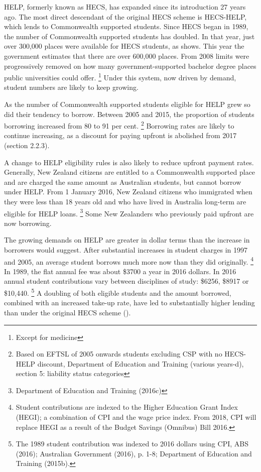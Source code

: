\documentclass[embargoed]{grattan}
\begin{document}
HELP, formerly known as HECS, has expanded since its introduction 27 years ago.
The most direct descendant of the original HECS scheme is HECS-HELP, which lends to Commonwealth supported students.
Since HECS began in 1989, the number of Commonwealth supported students has doubled.
In that year, just over 300,000 places were available for HECS students, as  shows.\afterpage{\cleardoublepage} %
This year the government estimates that there are over 600,000 places.
From 2008 limits were progressively removed on how many government-supported bachelor degree places public universities could offer.%
\footnote{Except for medicine} Under this system, now driven by demand, student numbers are likely to keep growing.


As the number of Commonwealth supported students eligible for HELP grew so did their tendency to borrow.
Between 2005 and 2015, the proportion of students borrowing increased from 80 to 91 per cent.%
\footnote{Based on EFTSL of 2005 onwards students excluding CSP with no HECS-HELP discount, Department of Education and Training (various years-d), section 5: liability status categories} Borrowing rates are likely to continue increasing, as a discount for paying upfront is abolished from 2017 (section 2.2.3).

A change to HELP eligibility rules is also likely to reduce upfront payment rates.
Generally, New Zealand citizens are entitled to a Commonwealth supported place and are charged the same amount as Australian students, but cannot borrow under HELP.
From 1 January 2016, New Zealand citizens who immigrated when they were less than 18 years old and who have lived in Australia long-term are eligible for HELP loans.%
\footnote{Department of Education and Training (2016c)} Some New Zealanders who previously paid upfront are now borrowing.

The growing demands on HELP are greater in dollar terms than the increase in borrowers would suggest.
After substantial increases in student charges in 1997 and 2005, an average student borrows much more now than they did originally.%
\footnote{Student contributions are indexed to the Higher Education Grant Index (HEGI); a combination of \gls{CPI} and the wage price index.
From 2018, \gls{CPI} will replace HEGI as a result of the Budget Savings (Omnibus) Bill 2016.} In 1989, the flat annual fee was about \$3700 a year in 2016 dollars.
In 2016 annual student contributions vary between disciplines of study: \$6256, \$8917 or \$10,440.%
\footnote{The 1989 student contribution was indexed to 2016 dollars using \gls{CPI}, ABS (2016); Australian Government (2016), p. 1-8; Department of Education and Training (2015b).} A doubling of both eligible students and the amount borrowed, combined with an increased take-up rate, have led to substantially higher lending than under the original HECS scheme ().
\end{document}
